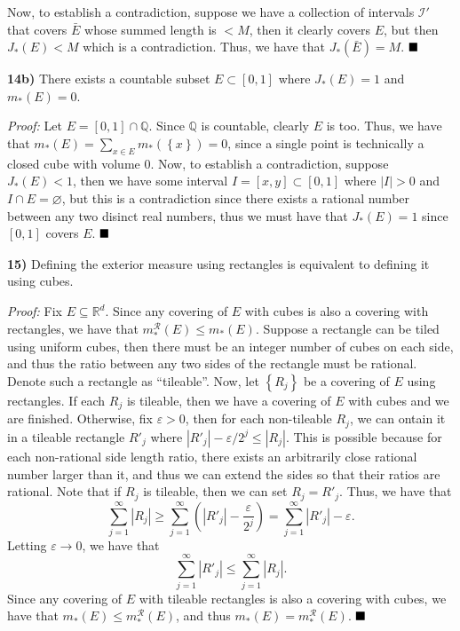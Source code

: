 \documentclass[12pt]{article}
\newcommand{\Q}{\ensuremath{\mathbb{Q}}}
\newcommand{\R}{\ensuremath{\mathbb{R}}}
\newcommand{\e}{\varepsilon}
\newcommand{\braceb}  [1]{\ensuremath{\left\{#1\right\}}}
\newcommand{\parenb}  [1]{\ensuremath{\left(#1\right)}}
\newcommand{\vertb}   [1]{\ensuremath{\left\vert#1\right\vert}}
\newcommand{\mc}[1]{\ensuremath{\mathcal{#1}}}
\newcommand{\done} {\ensuremath{\strut\hfill\blacksquare}}
\newcommand{\proof}{\textit{Proof: }}
\begin{document}
Now, to establish a contradiction, suppose we have a collection of intervals
\( \mc{I}' \) that covers \( \bar{E} \) whose summed length is \( < M \), then
it clearly covers \( E \), but then \( J_*(E) < M \) which is a contradiction.
Thus, we have that \( J_*(\bar{E}) = M \).
\done

\textbf{14b)} There exists a countable subset \( E \subset [0, 1] \) where
\( J_*(E) = 1 \) and \( m_*(E) = 0 \).

\proof
Let \( E = [0, 1] \cap \Q \).
Since \( \Q \) is countable, clearly \( E \) is too.
Thus, we have that \( m_*(E) = \sum_{x \in E} m_*(\braceb{x}) = 0 \), since a
single point is technically a closed cube with volume 0.
Now, to establish a contradiction, suppose \( J_*(E) < 1 \), then we have some
interval \( I = [x, y] \subset [0, 1] \) where \( \vertb{I} > 0 \) and
\( I \cap E = \varnothing \), but this is a contradiction since there exists
a rational number between any two disinct real numbers, thus we must have that
\( J_*(E) = 1 \) since \( [0, 1] \) covers \( E \).
\done

\textbf{15)} Defining the exterior measure using rectangles is equivalent
to defining it using cubes.

\proof
Fix \( E \subseteq \R^d \).
Since any covering of \( E \) with cubes is also a covering with rectangles, we
have that \( m^{\mc{R}}_*(E) \leq m_*(E) \).
Suppose a rectangle can be tiled using uniform cubes, then there must be an
integer number of cubes on each side, and thus the ratio between any two sides
of the rectangle must be rational.
Denote such a rectangle as ``tileable''.
Now, let \braceb{R_j} be a covering of \( E \) using rectangles.
If each \( R_j \) is tileable, then we have a covering of \( E \) with cubes
and we are finished.
Otherwise, fix \( \e > 0 \), then for each non-tileable \( R_j \), we can 
ontain it in a tileable rectangle \( R'_j \) where
\( \vertb{R'_j} - \e / 2^j \leq \vertb{R_j}  \).
This is possible because for each non-rational side length ratio, there exists
an arbitrarily close rational number larger than it, and thus we can extend the
sides so that their ratios are rational.
Note that if \( R_j \) is tileable, then we can set \( R_j = R'_j \).
Thus, we have that
\[
	\sum_{j = 1}^\infty \vertb{R_j}
	\geq \sum_{j = 1}^\infty \parenb{\vertb{R'_j} - \frac{\e}{2^j}}
	= \sum_{j = 1}^\infty \vertb{R'_j} - \e.
\]
Letting \( \e \to 0 \), we have that
\[
	\sum_{j = 1}^\infty \vertb{R'_j}
	\leq \sum_{j = 1}^\infty \vertb{R_j}.
\]
Since any covering of \( E \) with tileable rectangles is also a covering with
cubes, we have that \( m_*(E) \leq m_*^\mc{R}(E) \), and thus
\( m_*(E) = m_*^\mc{R}(E) \).
\done
\end{document}
